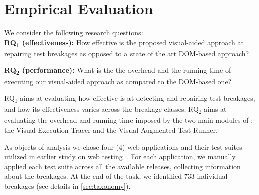 
\section{Empirical Evaluation}\label{sec:evaluation}


We consider the following research questions: \\
\noindent
\textbf{RQ\textsubscript{1} (effectiveness):} 
How effective is the proposed visual-aided approach at repairing test breakages as opposed to a state of the art DOM-based approach?

\noindent
\textbf{RQ\textsubscript{2} (performance):} What is the the overhead and the running time of executing our visual-aided approach as compared to the DOM-based one?

RQ\textsubscript{1} aims at evaluating how effective \tool is at detecting and repairing test breakages, and how its effectiveness varies across the breakage classes. 
RQ\textsubscript{2} aims at evaluating the overhead and running time imposed by the two main modules of \tool: the Visual Execution Tracer and the Visual-Augmented Test Runner.




%
As objects of analysis we chose four (4) web applications and their test suites utilized in earlier study on web testing~\cite{WCRE}. For each application, we manually applied each test suite across all the available releases, collecting information about the breakages. At the end of the task, we identified 733 individual breakages (see details in \autoref{sec:taxonomy}).

